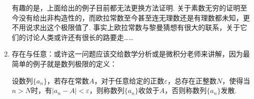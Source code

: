 \begin{enumerate}


          有趣的是，上面给出的例子目前都无法更换方法证明. 关于素数无穷的证明至今没有给出非构造性的，而欧拉常数至今甚至连无理数还是有理数都未知，更不用说求出这个极限值了. 事实上欧拉常数与黎曼猜想有很大的联系，关于它们的讨论人类或许还有很长的路要走\dots\dots

    \item 存在与任意：或许这一问题应该交给数学分析或是微积分老师来讲解，因为最简单的例子就是数列极限的定义：
          \begin{definition}
              设数列$\{a_n\}$，若存在常数$A$，对于任意给定的正数$\varepsilon$，总存在正整数$N$，使得当$n>N$时，有$|a_n-A|<\varepsilon$，则称数列$\{a_n\}$收敛于$A$，否则称数列$\{a_n\}$发散.
          \end{definition}


\end{enumerate}
